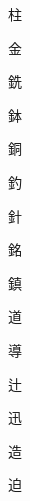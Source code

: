 \begin{spacing}{2.5}
{\Huge \begin{CJK}{UTF8}{min} 柱\end{CJK}}\hspace{0.1cm}
{\Huge \begin{CJK}{UTF8}{min} 金\end{CJK}}\hspace{0.1cm}
{\Huge \begin{CJK}{UTF8}{min} 銑\end{CJK}}\hspace{0.1cm}
{\Huge \begin{CJK}{UTF8}{min} 鉢\end{CJK}}\hspace{0.1cm}
{\Huge \begin{CJK}{UTF8}{min} 銅\end{CJK}}\hspace{0.1cm}
{\Huge \begin{CJK}{UTF8}{min} 釣\end{CJK}}\hspace{0.1cm}
{\Huge \begin{CJK}{UTF8}{min} 針\end{CJK}}\hspace{0.1cm}
{\Huge \begin{CJK}{UTF8}{min} 銘\end{CJK}}\hspace{0.1cm}
{\Huge \begin{CJK}{UTF8}{min} 鎮\end{CJK}}\hspace{0.1cm}
{\Huge \begin{CJK}{UTF8}{min} 道\end{CJK}}\hspace{0.1cm}
{\Huge \begin{CJK}{UTF8}{min} 導\end{CJK}}\hspace{0.1cm}
{\Huge \begin{CJK}{UTF8}{min} 辻\end{CJK}}\hspace{0.1cm}
{\Huge \begin{CJK}{UTF8}{min} 迅\end{CJK}}\hspace{0.1cm}
{\Huge \begin{CJK}{UTF8}{min} 造\end{CJK}}\hspace{0.1cm}
{\Huge \begin{CJK}{UTF8}{min} 迫\end{CJK}}\hspace{0.1cm}

\end{spacing}
